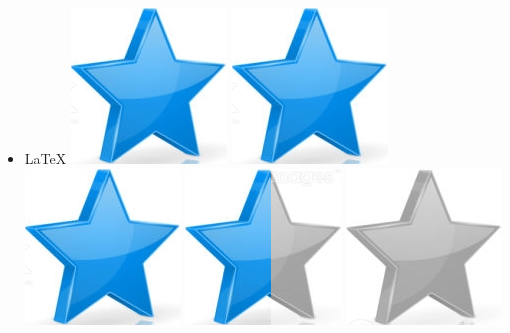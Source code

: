 \documentclass[10pt,a4paper,sans]{article}
\begin{document}
\begin{minipage}[t]{0.28\textwidth}
\begin{mdframed}[style=cadreCompetences]
\begin{itemize}
                \item{\LaTeX
                    \hfill
                    \includegraphics[scale=0.25]{img/star.png} \hspace{-0.22cm}
                    \includegraphics[scale=0.25]{img/star.png} \hspace{-0.22cm}
                    \includegraphics[scale=0.25]{img/star.png} \hspace{-0.22cm}
                    \includegraphics[scale=0.25]{img/half_star.png} \hspace{-0.22cm}
                    \includegraphics[scale=0.25]{img/empty_star.png}}
            \end{itemize}


\end{mdframed}
\end{minipage}
\end{document}
